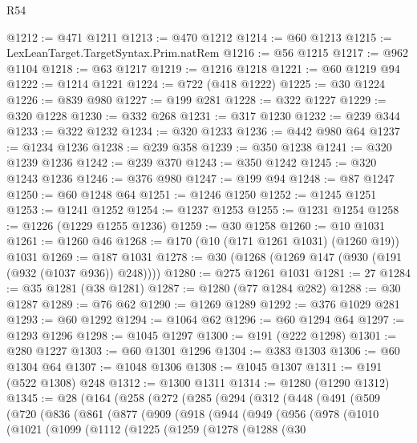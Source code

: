 \begin{lexlean}{R54}
\begin{coremodule}
@1212 := @471 @1211
@1213 := @470 @1212
@1214 := @60 @1213
@1215 := LexLeanTarget.TargetSyntax.Prim.natRem
@1216 := @56 @1215
@1217 := @962 @1104
@1218 := @63 @1217
@1219 := @1216 @1218
@1221 := @60 @1219 @94
@1222 := @1214 @1221
@1224 := @722 (@418 @1222)
@1225 := @30 @1224
@1226 := @839 @980
@1227 := @199 @281
@1228 := @322 @1227
@1229 := @320 @1228
@1230 := @332 @268
@1231 := @317 @1230
@1232 := @239 @344
@1233 := @322 @1232
@1234 := @320 @1233
@1236 := @442 @980 @64
@1237 := @1234 @1236
@1238 := @239 @358
@1239 := @350 @1238
@1241 := @320 @1239 @1236
@1242 := @239 @370
@1243 := @350 @1242
@1245 := @320 @1243 @1236
@1246 := @376 @980
@1247 := @199 @94
@1248 := @87 @1247
@1250 := @60 @1248 @64
@1251 := @1246 @1250
@1252 := @1245 @1251
@1253 := @1241 @1252
@1254 := @1237 @1253
@1255 := @1231 @1254
@1258 := @1226 (@1229 @1255 @1236)
@1259 := @30 @1258
@1260 := @10 @1031
@1261 := @1260 @46
@1268 := @170 (@10 (@171 @1261 @1031) (@1260 @19)) @1031
@1269 := @187 @1031
@1278 := @30 (@1268 (@1269 @147 (@930 (@191 (@932 (@1037 @936)) @248))))
@1280 := @275 @1261 @1031
@1281 := 27
@1284 := @35 @1281 (@38 @1281)
@1287 := @1280 (@77 @1284 @282)
@1288 := @30 @1287
@1289 := @76 @62
@1290 := @1269 @1289
@1292 := @376 @1029 @281
@1293 := @60 @1292
@1294 := @1064 @62
@1296 := @60 @1294 @64
@1297 := @1293 @1296
@1298 := @1045 @1297
@1300 := @191 (@222 @1298)
@1301 := @280 @1227
@1303 := @60 @1301 @1296
@1304 := @383 @1303
@1306 := @60 @1304 @64
@1307 := @1048 @1306
@1308 := @1045 @1307
@1311 := @191 (@522 @1308) @248
@1312 := @1300 @1311
@1314 := @1280 (@1290 @1312)
@1345 := @28
    (@164
      (@258
        (@272
          (@285
            (@294
              (@312
                (@448
                  (@491
                    (@509
                      (@720
                        (@836
                          (@861
                            (@877
                              (@909
                                (@918
                                  (@944
                                    (@949
                                      (@956
                                        (@978
                                          (@1010
                                            (@1021
                                              (@1099
                                                (@1112
                                                  (@1225
                                                    (@1259
                                                      (@1278
                                                        (@1288
                                                          (@30

\end{coremodule}
\end{lexlean}

